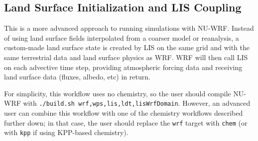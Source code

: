 \subsection{Land Surface Initialization and LIS Coupling}
\label{subsec:LisWorkflow}

This is a more advanced approach to running simulations with NU-WRF. Instead
of using land surface fields interpolated from a coarser model or reanalysis,
a custom-made land surface state is created by LIS on the same grid and with
the same terrestrial data and land surface physics as WRF.  WRF will then
call LIS on each advective time step, providing atmospheric forcing data
and receiving land surface data (fluxes, albedo, etc) in return. 

For simplicity, this workflow uses no chemistry,  so the user should compile 
NU-WRF with \texttt{./build.sh wrf,wps,lis,ldt,lisWrfDomain}. However, an 
advanced user can combine this workflow with one of the chemistry workflows 
described further down; in that case, the user should replace the \texttt{wrf}
target with \texttt{chem} (or with \texttt{kpp} if using KPP-based chemistry).

